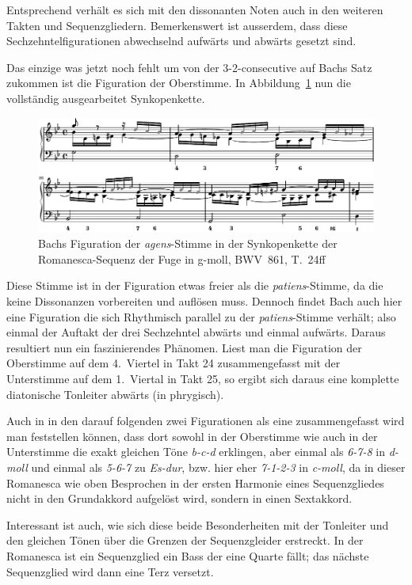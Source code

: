 Entsprechend verhält es sich mit den dissonanten Noten auch in den weiteren Takten und Sequenzgliedern.
Bemerkenswert ist ausserdem, dass diese Sechzehntelfigurationen abwechselnd aufwärts und abwärts gesetzt sind.

Das einzige was jetzt noch fehlt um von der 3-2-consecutive auf Bachs Satz zukommen ist die Figuration der Oberstimme. In Abbildung~\ref{fig:bwv681-agens-verziert} nun die vollständig ausgearbeitet Synkopenkette.

\begin{figure}[htbp]
	\centering
	\includegraphics{lilypond/g-moll/render/romanesca-agens-verziert}
	\caption{Bachs Figuration der \emph{agens}-Stimme in der Synkopenkette der Romanesca-Sequenz der Fuge in g-moll, BWV~861, T.~24ff}
	\label{fig:bwv681-agens-verziert}
\end{figure}

Diese Stimme ist in der Figuration etwas freier als die \emph{patiens}-Stimme, da die keine Dissonanzen vorbereiten und auflösen muss.
Dennoch findet Bach auch hier eine Figuration die sich Rhythmisch parallel zu der \emph{patiens}-Stimme verhält; also einmal der Auftakt der drei Sechzehntel abwärts und einmal aufwärts.
Daraus resultiert nun ein faszinierendes Phänomen.
Liest man die Figuration der Oberstimme auf dem 4.~Viertel in Takt 24 zusammengefasst mit der Unterstimme auf dem 1.~Viertal in Takt 25, so ergibt sich daraus eine komplette diatonische Tonleiter abwärts (in phrygisch).

Auch in in den darauf folgenden zwei Figurationen als eine zusammengefasst wird man feststellen können, dass dort sowohl in der Oberstimme wie auch in der Unterstimme die exakt gleichen Töne \emph{b-c-d} erklingen, aber einmal als \emph{6-7-8} in \emph{d-moll} und einmal als \emph{5-6-7} zu \emph{Es-dur}, bzw. hier eher \emph{7-1-2-3} in \emph{c-moll}, da in dieser Romanesca wie oben Besprochen in der ersten Harmonie eines Sequenzgliedes nicht in den Grundakkord aufgelöst wird, sondern in einen Sextakkord.

Interessant ist auch, wie sich diese beide Besonderheiten mit der Tonleiter und den gleichen Tönen über die Grenzen der Sequenzgleider erstreckt.
In der Romanesca ist ein Sequenzglied ein Bass der eine Quarte fällt; das nächste Sequenzglied wird dann eine Terz versetzt.

